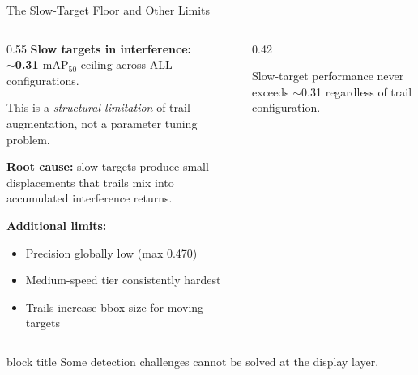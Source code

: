 \documentclass[aspectratio=169, 10pt]{beamer}
\newcommand{\maptf}{\text{mAP}_{50}}
\newcommand{\emphnum}[1]{\textcolor{Garnet}{\textbf{#1}}}
\newcommand{\keypoint}[1]{%
  \vfill
  \begin{beamercolorbox}[wd=\textwidth, dp=0.4em, leftskip=0.3cm]{block title}%
    \small #1%
  \end{beamercolorbox}%
}
\begin{document}
\begin{frame}{The Slow-Target Floor and Other Limits}

\begin{columns}[T]
\begin{column}{0.55\textwidth}
  \textbf{Slow targets in interference:}\\
  $\sim$\emphnum{0.31 $\maptf$} ceiling across ALL configurations.

  \vspace{0.2cm}

  This is a \textit{structural limitation} of trail augmentation, not a
  parameter tuning problem.

  \vspace{0.2cm}

  \textbf{Root cause:} slow targets produce small displacements that trails
  mix into accumulated interference returns.

  \vspace{0.2cm}

  \textbf{Additional limits:}
  \begin{itemize}
    \item Precision globally low (max 0.470)
    \item Medium-speed tier consistently hardest
    \item Trails increase bbox size for moving targets
  \end{itemize}
\end{column}
\begin{column}{0.42\textwidth}
  \begin{center}
  \end{center}
  {\small\centering Slow-target performance never exceeds $\sim$0.31 regardless
  of trail configuration.}
\end{column}
\end{columns}

\keypoint{Some detection challenges cannot be solved at the display layer.}
\end{frame}
\end{document}

